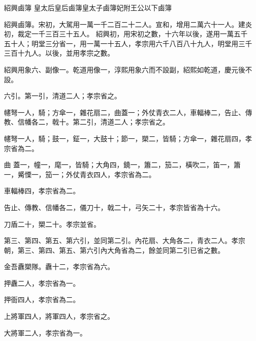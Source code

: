 
\begin{pinyinscope}

 紹興鹵簿
 皇太后皇后鹵簿皇太子鹵簿妃附王公以下鹵簿



 紹興鹵簿。宋初，大駕用一萬一千二百二十二人。宣和，增用二萬六十一人。建炎初，裁定一千三百三十五人。
 紹興初，用宋初之數，十六年以後，遂用一萬五千五十人；明堂三分省一，用一萬一十五人，孝宗用六千八百八十九人，明堂用三千三百十九人。以後，並用孝宗之數。



 紹興用象六、副像一。乾道用像一，淳熙用象六而不設副，紹熙如乾道，慶元後不設。



 六引。第一引，清道二人；孝宗省之。



 幰弩一人，騎；方傘一，雜花扇二，曲蓋一；外仗青衣二人，車輻棒二，告止、傳教、信幡各二，戟十。第二引，清道二人；孝宗省之。



 幰弩一人，騎；鼓一，鉦一，大鼓十；節一，槊二，皆騎；方傘一，雜花扇四，孝宗省為二。



 曲
 蓋一，幢一，麾一，皆騎；大角四，鐃一，簫二，笳二，橫吹二，笛一，簫一，觱慄一，笳一；外仗青衣四人，孝宗省為二。



 車輻棒四，孝宗省為二。



 告止、傳教、信幡各二，儀刀十，戟二十，弓矢二十，孝宗皆省為十六。



 刀盾二十，槊二十。孝宗並省。



 第三、第四、第五、第六引，並同第二引。內花扇、大角各二，青衣二人。孝宗朝，第三、第四、第五、第六引內大角省為二，餘並同第二引已省之數。



 金吾纛槊隊。纛十二，孝宗省為六。



 押纛二人，孝宗省為一。



 押衙四人，孝宗省為二。



 上將軍四人，將軍四人，孝宗省之。



 大將軍二人，孝宗省為一。




\end{pinyinscope}
